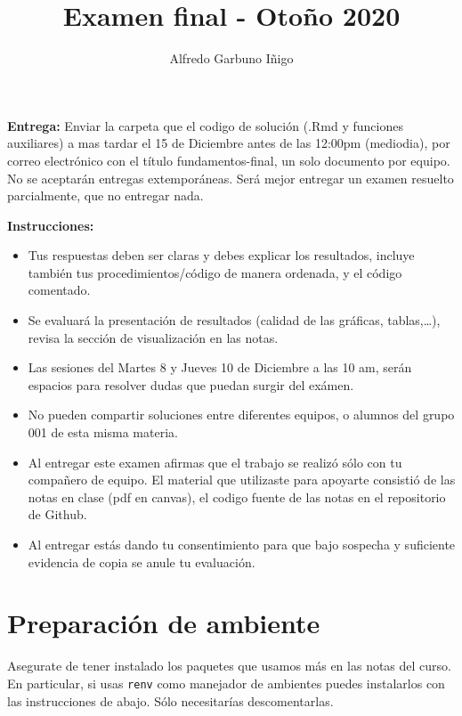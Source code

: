 \documentclass[
]{article}
\title{Examen final - Otoño 2020}
\author{Alfredo Garbuno Iñigo}
\date{}
\begin{document}
\maketitle

\textbf{Entrega:} Enviar la carpeta que el codigo de solución (.Rmd y
funciones auxiliares) a mas tardar el 15 de Diciembre antes de las
12:00pm (mediodia), por correo electrónico con el título
fundamentos-final, un solo documento por equipo. No se aceptarán
entregas extemporáneas. Será mejor entregar un examen resuelto
parcialmente, que no entregar nada.

\textbf{Instrucciones:}

\begin{itemize}
\item
  Tus respuestas deben ser claras y debes explicar los resultados,
  incluye también tus procedimientos/código de manera ordenada, y el
  código comentado.
\item
  Se evaluará la presentación de resultados (calidad de las gráficas,
  tablas,\ldots), revisa la sección de visualización en las notas.
\item
  Las sesiones del Martes 8 y Jueves 10 de Diciembre a las 10 am, serán
  espacios para resolver dudas que puedan surgir del exámen.
\item
  No pueden compartir soluciones entre diferentes equipos, o alumnos del
  grupo 001 de esta misma materia.
\item
  Al entregar este examen afirmas que el trabajo se realizó sólo con tu
  compañero de equipo. El material que utilizaste para apoyarte
  consistió de las notas en clase (pdf en canvas), el codigo fuente de
  las notas en el repositorio de Github.
\item
  Al entregar estás dando tu consentimiento para que bajo sospecha y
  suficiente evidencia de copia se anule tu evaluación.
\end{itemize}

\hypertarget{preparaciuxf3n-de-ambiente}{%
\section{Preparación de ambiente}\label{preparaciuxf3n-de-ambiente}}

Asegurate de tener instalado los paquetes que usamos más en las notas
del curso. En particular, si usas \texttt{renv} como manejador de
ambientes puedes instalarlos con las instrucciones de abajo. Sólo
necesitarías descomentarlas.
\end{document}
